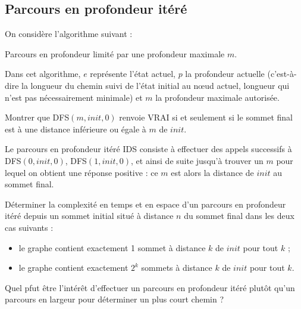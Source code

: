 \subsection{Parcours en profondeur itéré}

On considère l'algorithme suivant :

\begin{algorithm}
  \caption{Parcours en profondeur limité par une profondeur maximale $m$.}
  \label{fig:dfs}
  \begin{algorithmic}
        \State {}
      \EndIf
        \State {}
      \EndIf
          \State {}
        \EndIf
      \EndFor
      \State {}
    \EndFunction
  \end{algorithmic}
\end{algorithm}

Dans cet algorithme, $e$ représente l'état actuel, $p$ la profondeur actuelle
(c'est-à-dire la longueur du chemin suivi de l'état initial au nœud actuel,
longueur qui n'est pas nécessairement minimale) et $m$ la profondeur maximale
autorisée.

\begin{ques}
  Montrer que \textsc{DFS}$(m, init, 0)$ renvoie VRAI si et seulement si
  le sommet final est à une distance inférieure ou égale à $m$ de $init$.
\end{ques}\medskip

Le parcours en profondeur itéré \textsc{IDS} consiste à effectuer des appels
successifs à \textsc{DFS}$(0, init, 0)$, \textsc{DFS}$(1, init, 0)$,
et ainsi de suite jusqu'à trouver un $m$ pour lequel on obtient une
réponse positive : ce $m$ est alors la distance de $init$ au sommet
final.

\begin{ques}
  Déterminer la complexité en temps et en espace d'un parcours en
  profondeur itéré depuis un sommet initial situé à distance $n$
  du sommet final dans les deux cas suivants :
  \begin{itemize}
    \item le graphe contient exactement 1 sommet à distance $k$
          de $init$ pour tout $k$ ;
    \item le graphe contient exactement $2^{k}$ sommets à distance
          $k$ de $init$ pour tout $k$.
  \end{itemize}
  Quel pfut être l'intérêt d'effectuer un parcours en profondeur itéré
  plutôt qu'un parcours en largeur pour déterminer un plus court
  chemin ?
\end{ques}

